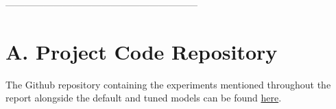 \documentclass[10pt,twocolumn,letterpaper]{article}
\begin{document}







------------------------------------------------------------


\newpage

{\small


}


\newpage

\section{A. Project Code Repository}
The Github repository containing the experiments mentioned throughout the report alongside the default and tuned models can be found \hyperlink{https://github.com/jadenzwicker/DL-Final-Project/tree/main}{here}. 
\end{document}
